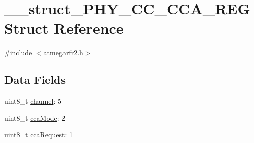 \hypertarget{struct____struct___p_h_y___c_c___c_c_a___r_e_g}{\section{\-\_\-\-\_\-struct\-\_\-\-P\-H\-Y\-\_\-\-C\-C\-\_\-\-C\-C\-A\-\_\-\-R\-E\-G Struct Reference}
\label{struct____struct___p_h_y___c_c___c_c_a___r_e_g}
}


{\ttfamily \#include $<$atmegarfr2.\-h$>$}

\subsection*{Data Fields}
\begin{DoxyCompactItemize}
\item 
uint8\-\_\-t \hyperlink{struct____struct___p_h_y___c_c___c_c_a___r_e_g_a235cb675053a6716c529898ec4c4b174}{channel}\-: 5
\item 
uint8\-\_\-t \hyperlink{struct____struct___p_h_y___c_c___c_c_a___r_e_g_a0f933841f08b6f4c1ef046b79b36e600}{cca\-Mode}\-: 2
\item 
uint8\-\_\-t \hyperlink{struct____struct___p_h_y___c_c___c_c_a___r_e_g_a641a5863159ac4d82fec4cd42e8126e9}{cca\-Request}\-: 1
\end{DoxyCompactItemize}


